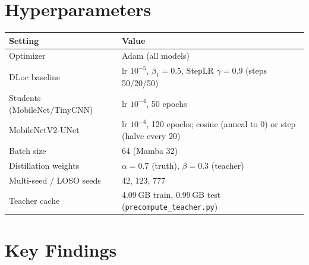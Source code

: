 \documentclass[11pt]{article}
\begin{document}
\section{Hyperparameters}

\begin{table}[h]\centering\footnotesize
\begin{tabular}{@{}ll@{}}
\toprule
\textbf{Setting} & \textbf{Value} \\
\midrule
Optimizer                    & Adam (all models) \\
DLoc baseline                & lr $10^{-5}$, $\beta_1{=}0.5$, StepLR $\gamma{=}0.9$ (steps 50/20/50) \\
Students (MobileNet/TinyCNN) & lr $10^{-4}$, 50 epochs \\
MobileNetV2-UNet             & lr $10^{-4}$, 120 epochs; cosine (anneal to 0) or step (halve every 20) \\
Batch size                   & 64 (Mamba 32) \\
Distillation weights         & $\alpha{=}0.7$ (truth), $\beta{=}0.3$ (teacher) \\
Multi-seed / LOSO seeds      & 42, 123, 777 \\
Teacher cache                & 4.09\,GB train, 0.99\,GB test (\texttt{precompute\_teacher.py}) \\
\bottomrule
\end{tabular}
\end{table}

\section{Key Findings}
\end{document}
